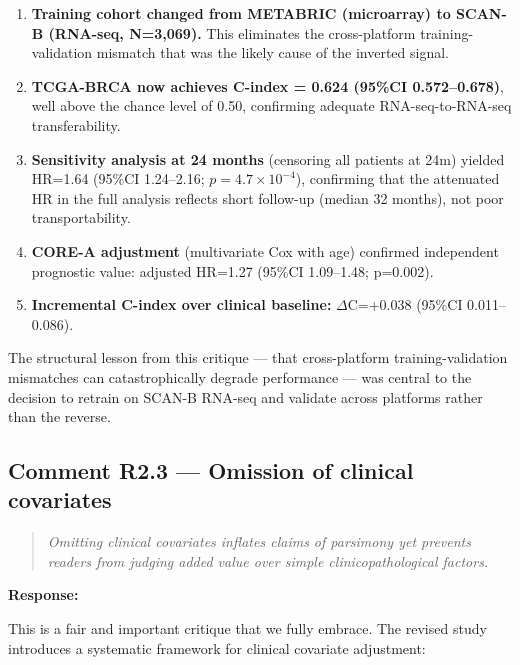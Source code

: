 \documentclass[11pt]{article}
\newcommand{\reviewerquote}[1]{\begin{quote}\itshape #1\end{quote}}
\begin{document}
\begin{enumerate}
  \item \textbf{Training cohort changed from METABRIC (microarray) to SCAN-B (RNA-seq, N=3,069).} This eliminates the cross-platform training-validation mismatch that was the likely cause of the inverted signal.
  \item \textbf{TCGA-BRCA now achieves C-index = 0.624 (95\%CI 0.572--0.678)}, well above the chance level of 0.50, confirming adequate RNA-seq-to-RNA-seq transferability.
  \item \textbf{Sensitivity analysis at 24 months} (censoring all patients at 24m) yielded HR=1.64 (95\%CI 1.24--2.16; $p=4.7\times10^{-4}$), confirming that the attenuated HR in the full analysis reflects short follow-up (median 32 months), not poor transportability.
  \item \textbf{CORE-A adjustment} (multivariate Cox with age) confirmed independent prognostic value: adjusted HR=1.27 (95\%CI 1.09--1.48; p=0.002).
  \item \textbf{Incremental C-index over clinical baseline:} $\Delta$C=+0.038 (95\%CI 0.011--0.086).
\end{enumerate}

The structural lesson from this critique --- that cross-platform training-validation mismatches can catastrophically degrade performance --- was central to the decision to retrain on SCAN-B RNA-seq and validate across platforms rather than the reverse.

\subsection*{Comment R2.3 --- Omission of clinical covariates}

\reviewerquote{Omitting clinical covariates inflates claims of parsimony yet prevents readers from judging added value over simple clinicopathological factors.}

\noindent\textbf{Response:}

This is a fair and important critique that we fully embrace. The revised study introduces a systematic framework for clinical covariate adjustment:
\end{document}

